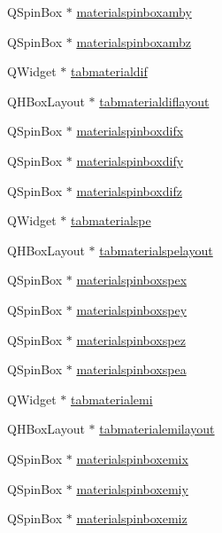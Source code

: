\begin{DoxyCompactItemize}
\item 
Q\+Spin\+Box $\ast$ \hyperlink{class_mondock_a52f12188582ccf1488a2f5f2059ec304}{materialspinboxamby}
\item 
Q\+Spin\+Box $\ast$ \hyperlink{class_mondock_a24725d21ed105e3d2fc2c2360c2581a6}{materialspinboxambz}
\item 
Q\+Widget $\ast$ \hyperlink{class_mondock_a1d05427fb146c04086803be70153d868}{tabmaterialdif}
\item 
Q\+H\+Box\+Layout $\ast$ \hyperlink{class_mondock_a346764281a416f9221d71a96cf9ce4fc}{tabmaterialdiflayout}
\item 
Q\+Spin\+Box $\ast$ \hyperlink{class_mondock_abf580ff2de20747ff28cb3af69aec147}{materialspinboxdifx}
\item 
Q\+Spin\+Box $\ast$ \hyperlink{class_mondock_ab1c4bb9e29202b1fcb3d4f2f2f7112a8}{materialspinboxdify}
\item 
Q\+Spin\+Box $\ast$ \hyperlink{class_mondock_abaa05027f2871448e35b82516e0559b8}{materialspinboxdifz}
\item 
Q\+Widget $\ast$ \hyperlink{class_mondock_a7f99e6c98995aa1e236e44be190e0fa6}{tabmaterialspe}
\item 
Q\+H\+Box\+Layout $\ast$ \hyperlink{class_mondock_a705948bf976e373b5afb90c9f0641580}{tabmaterialspelayout}
\item 
Q\+Spin\+Box $\ast$ \hyperlink{class_mondock_a964af1b06eda72c95695ff25146892ec}{materialspinboxspex}
\item 
Q\+Spin\+Box $\ast$ \hyperlink{class_mondock_a38fad0c6901791690bdedba633bc3220}{materialspinboxspey}
\item 
Q\+Spin\+Box $\ast$ \hyperlink{class_mondock_ab5e93ab98c43f314fa48b84be8098beb}{materialspinboxspez}
\item 
Q\+Spin\+Box $\ast$ \hyperlink{class_mondock_a62de223ddabe875e9406fd43b892a8a0}{materialspinboxspea}
\item 
Q\+Widget $\ast$ \hyperlink{class_mondock_af4e2b3e87db243b8813a3e71cbf9dd7d}{tabmaterialemi}
\item 
Q\+H\+Box\+Layout $\ast$ \hyperlink{class_mondock_afc37221d5733642eeeeaf93042d72dcb}{tabmaterialemilayout}
\item 
Q\+Spin\+Box $\ast$ \hyperlink{class_mondock_a003c7eff97a356c6dc6d7f892719e91f}{materialspinboxemix}
\item 
Q\+Spin\+Box $\ast$ \hyperlink{class_mondock_a92982a92a14d612a49dd027cb68b6d73}{materialspinboxemiy}
\item 
Q\+Spin\+Box $\ast$ \hyperlink{class_mondock_ab95fca34ebe4db052bab4109eaf5afd1}{materialspinboxemiz}

\end{DoxyCompactItemize}
